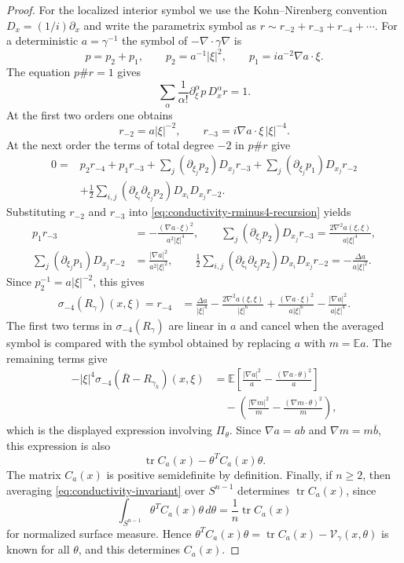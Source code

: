\documentclass[11pt]{article}
\newcommand{\E}{\mathbb E}
\newcommand{\tr}{\operatorname{tr}}
\theoremstyle{plain}
\theoremstyle{definition}
\theoremstyle{remark}
\begin{document}
\begin{proof}
For the localized interior symbol we use the Kohn--Nirenberg convention
$D_x=(1/i)\partial_x$ and write the parametrix symbol as
$r\sim r_{-2}+r_{-3}+r_{-4}+\cdots$.  For a deterministic
$a=\gamma^{-1}$ the symbol of $-\nabla\cdot\gamma\nabla$ is
\[
  p=p_2+p_1,
  \qquad
  p_2=a^{-1}|\xi|^2,
  \qquad
  p_1=ia^{-2}\nabla a\cdot\xi .
\]
The equation $p\# r=1$ gives
\[
  \sum_\alpha\frac1{\alpha!}\partial_\xi^\alpha p\,D_x^\alpha r=1.
\]
At the first two orders one obtains
\[
  r_{-2}=a|\xi|^{-2},
  \qquad
  r_{-3}=i\nabla a\cdot\xi\,|\xi|^{-4}.
\]
At the next order the terms of total degree $-2$ in $p\# r$ give
\begin{equation}\label{eq:conductivity-rminus4-recursion}
\begin{split}
0={}&p_2r_{-4}+p_1r_{-3}
 +\sum_j(\partial_{\xi_j}p_2)D_{x_j}r_{-3}
 +\sum_j(\partial_{\xi_j}p_1)D_{x_j}r_{-2}  \\
&+\frac12\sum_{i,j}(\partial_{\xi_i}\partial_{\xi_j}p_2)
  D_{x_i}D_{x_j}r_{-2}.
\end{split}
\end{equation}
Substituting $r_{-2}$ and $r_{-3}$ into \eqref{eq:conductivity-rminus4-recursion} yields
\[
\begin{split}
 p_1r_{-3}&=-\frac{(\nabla a\cdot\xi)^2}{a^2|\xi|^4},\qquad
 \sum_j(\partial_{\xi_j}p_2)D_{x_j}r_{-3}
 =\frac{2\nabla^2a(\xi,\xi)}{a|\xi|^4},\\
 \sum_j(\partial_{\xi_j}p_1)D_{x_j}r_{-2}
 &=\frac{|\nabla a|^2}{a^2|\xi|^2},\qquad
 \frac12\sum_{i,j}(\partial_{\xi_i}\partial_{\xi_j}p_2)
  D_{x_i}D_{x_j}r_{-2}
 =-\frac{\Delta a}{a|\xi|^2}.
\end{split}
\]
Since $p_2^{-1}=a|\xi|^{-2}$, this gives
\begin{align*}
 \sigma_{-4}(R_\gamma)(x,\xi)=r_{-4}
 &=\frac{\Delta a}{|\xi|^4}
 -\frac{2\nabla^2a(\xi,\xi)}{|\xi|^6}
 +\frac{(\nabla a\cdot\xi)^2}{a|\xi|^6}
 -\frac{|\nabla a|^2}{a|\xi|^4}.
\end{align*}
The first two terms in $\sigma_{-4}(R_\gamma)$ are linear in $a$ and cancel when the averaged symbol is compared with the symbol obtained by replacing $a$ with $m=\E a$.  The remaining terms give
\[
\begin{split}
- |\xi|^4\sigma_{-4}(\overline R-R_{\gamma_h})(x,\xi)
&=\E\left[\frac{|\nabla a|^2}{a}
     -\frac{(\nabla a\cdot\theta)^2}{a}\right] \\
&\quad -\left(\frac{|\nabla m|^2}{m}
     -\frac{(\nabla m\cdot\theta)^2}{m}\right),
\end{split}
\]
which is the displayed expression involving $\Pi_\theta$.  Since $\nabla a=ab$ and $\nabla m=m\overline b$, this expression is also
\[
  \tr C_a(x)-\theta^TC_a(x)\theta.
\]
The matrix $C_a(x)$ is positive semidefinite by definition.  Finally, if $n\ge2$, then averaging \eqref{eq:conductivity-invariant} over $S^{n-1}$ determines $\tr C_a(x)$, since
\[
  \int_{S^{n-1}}\theta^TC_a(x)\theta\,d\theta
  =\frac1n\tr C_a(x)
\]
for normalized surface measure.  Hence $\theta^TC_a(x)\theta=\tr C_a(x)-\mathcal V_\gamma(x,\theta)$ is known for all $\theta$, and this determines $C_a(x)$.
\end{proof}
\end{document}
